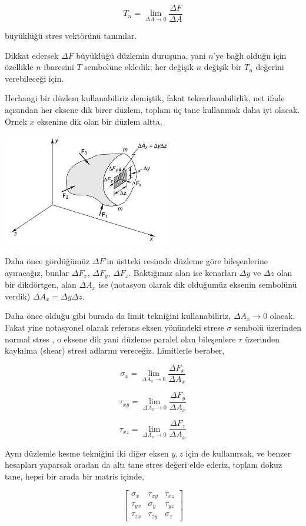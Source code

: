 \documentclass[12pt,fleqn]{article}\usepackage{../../common}
\begin{document}
$$
T_n = \lim_{\Delta A \to 0} \frac{\Delta F}{\Delta A}
$$

büyüklüğü stres vektörünü tanımlar.

Dikkat edersek $\Delta F$ büyüklüğü düzlemin duruşuna, yani $n$'ye bağlı olduğu
için özellikle $n$ ibaresini $T$ sembolüne ekledik; her değişik $n$ değişik bir
$T_n$ değerini verebileceği için.

Herhangi bir düzlem kullanabiliriz demiştik, fakat tekrarlanabilirlik, net ifade
açısından her eksene dik birer düzlem, toplam üç tane kullanmak daha iyi
olacak. Örnek $x$ eksenine dik olan bir düzlem altta,

\includegraphics[width=20em]{phy_020_strs_02_app_03.jpg}

Daha önce gördüğümüz $\Delta F$'in üstteki resimde düzleme göre bileşenlerine
ayıracağız, bunlar $\Delta F_x$, $\Delta F_y$, $\Delta F_z$. Baktığımız alan ise
kenarları $\Delta y$ ve $\Delta z$ olan bir dikdörtgen, alan $\Delta A_x$ ise
(notasyon olarak dik olduğumüz eksenin sembolünü verdik)
$\Delta A_x = \Delta y \Delta z$.

Daha önce olduğu gibi burada da limit tekniğini kullanabiliriz, $\Delta A_x \to
0$ olacak. Fakat yine notasyonel olarak referans eksen yönündeki strese $\sigma$
sembolü üzerinden normal stres , o eksene dik yani düzleme paralel olan
bileşenlere $\tau$ üzerinden kaykılma (shear) stresi adlarını vereceğiz.
Limitlerle beraber,

$$
\sigma_x = \lim_{\Delta A_x \to 0 } \frac{\Delta F_x}{\Delta A_x}
$$

$$
\tau_{xy} = \lim_{\Delta A_x \to 0 } \frac{\Delta F_y}{\Delta A_x}
$$

$$
\tau_{xz} = \lim_{\Delta A_x \to 0 } \frac{\Delta F_z}{\Delta A_x}
$$

Aynı düzlemle kesme tekniğini iki diğer eksen $y,z$ için de kullanırsak, ve
benzer hesapları yaparsak oradan da altı tane stres değeri elde ederiz, toplam
dokuz tane, hepsi bir arada bir matris içinde,

$$
\left[\begin{array}{rrr}
\sigma_x & \tau_{xy} & \tau_{xz} \\
\tau_{yx} & \sigma_y & \tau_{yz} \\
\tau_{zx} & \tau_{zy} & \sigma_z
\end{array}\right]
$$
\end{document}
